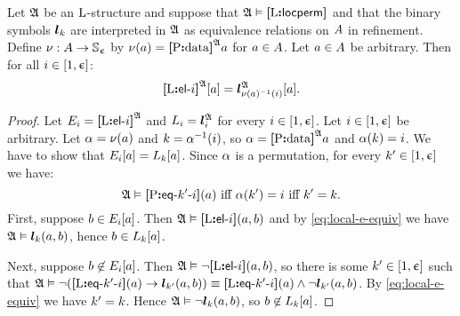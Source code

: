 \begin{remark}\label{rem:local-e-m}
Let $\mathfrak{A}$ be an $\mathrm{L}$-structure and suppose that $\mathfrak{A} \vDash {\bm{[}\mathrm{L}\mathord{\bm{:}}\mathsf{locperm}\bm{]}}$
and that the binary symbols $\bm{l}_{k}$ are interpreted in $\mathfrak{A}$ as equivalence
relations on $A$ in refinement.
Define $\nu : A \to \mathbb{S}_{\upepsilon}$ by $\nu(a) = {\bm{[}\mathrm{P}\mathord{\bm{:}}\mathrm{data}\bm{]}}^{\mathfrak{A}}a$
for $a \in A$.
Let $a \in A$ be arbitrary.
Then for all $i \in [1,\upepsilon]$:
\[
  {\bm{[}\mathrm{L}\mathord{\bm{:}}\mathsf{el}{\hbox{-}}i\bm{]}}^{\mathfrak{A}}[a] = \bm{l}_{\nu(a)^{-1}(i)}^{\mathfrak{A}}[a].
\]
\end{remark}
\begin{proof}
Let $E_{i} = {\bm{[}\mathrm{L}\mathord{\bm{:}}\mathsf{el}{\hbox{-}}i\bm{]}}^{\mathfrak{A}}$ and $L_{i} = \bm{l}_{i}^{\mathfrak{A}}$
for every $i \in [1,\upepsilon]$.
Let $i \in [1,\upepsilon]$ be arbitrary. 
Let $\alpha = \nu(a)$ and $k = \alpha^{-1}(i)$,
so $\alpha = {\bm{[}\mathrm{P}\mathord{\bm{:}}\mathrm{data}\bm{]}}^{\mathfrak{A}}a$ and $\alpha(k) = i$.
We have to show that $E_{i}[a] = L_{k}[a]$.
Since $\alpha$ is a permutation, for every ${k'} \in [1,\upepsilon]$ we have:
\begin{equation}\label{eq:local-e-equiv}
  \mifff{
  \StrA \vDash \feqAA\PS\kkp\ii(\ea)}{
  \perma(\kkp) = \ii}{ 
  \kkp = \kk}.
\end{equation}
First, suppose $b \in E_{i}[a]$.
Then $\mathfrak{A} \vDash {\bm{[}\mathrm{L}\mathord{\bm{:}}\mathsf{el}{\hbox{-}}i\bm{]}}(a,b)$ and by \cref{eq:local-e-equiv} we have
$\mathfrak{A} \vDash \bm{l}_{k}(a,b)$, hence $b \in L_{k}[a]$.

Next, suppose $b \not\in E_{i}[a]$.
Then $\mathfrak{A} \vDash \lnot{\bm{[}\mathrm{L}\mathord{\bm{:}}\mathsf{el}{\hbox{-}}i\bm{]}}(a,b)$, so there is some
${k'} \in [1,\upepsilon]$ such that 
$\mathfrak{A} \vDash \lnot({\bm{[}\mathrm{L}\mathord{\bm{:}}\mathsf{eq}{\hbox{-}}{k'}{\hbox{-}}i\bm{]}}(a) \rightarrow \bm{l}_{{k'}}(a,b)) 
\equiv {\bm{[}\mathrm{L}\mathord{\bm{:}}\mathsf{eq}{\hbox{-}}{k'}{\hbox{-}}i\bm{]}}(a) \land \lnot\bm{l}_{{k'}}(a,b)$.
By \cref{eq:local-e-equiv} we have ${k'} = k$.
Hence $\mathfrak{A} \vDash \lnot \bm{l}_{k}(a,b)$, so $b \not\in L_{k}[a]$.
\end{proof}

